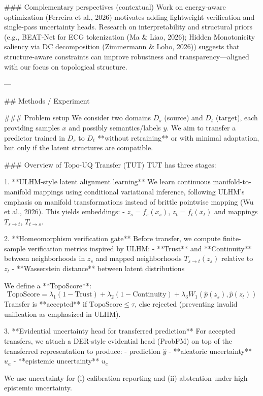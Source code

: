 ### Complementary perspectives (contextual)  
Work on energy-aware optimization (Ferreira et al., 2026) motivates adding lightweight verification and single-pass uncertainty heads. Research on interpretability and structural priors (e.g., BEAT-Net for ECG tokenization (Ma & Liao, 2026); Hidden Monotonicity saliency via DC decomposition (Zimmermann & Loho, 2026)) suggests that structure-aware constraints can improve robustness and transparency—aligned with our focus on topological structure.

---

## Methods / Experiment  

### Problem setup  
We consider two domains \(D_s\) (source) and \(D_t\) (target), each providing samples \(x\) and possibly semantics/labels \(y\). We aim to transfer a predictor trained in \(D_s\) to \(D_t\) **without retraining** or with minimal adaptation, but only if the latent structures are compatible.

### Overview of Topo-UQ Transfer (TUT)  
TUT has three stages:

1. **ULHM-style latent alignment learning**  
We learn continuous manifold-to-manifold mappings using conditional variational inference, following ULHM’s emphasis on manifold transformations instead of brittle pointwise mapping (Wu et al., 2026). This yields embeddings:
- \(z_s = f_s(x_s)\), \(z_t = f_t(x_t)\)  
and mappings \(T_{s\to t}\), \(T_{t\to s}\).

2. **Homeomorphism verification gate**  
Before transfer, we compute finite-sample verification metrics inspired by ULHM:
- **Trust** and **Continuity** between neighborhoods in \(z_s\) and mapped neighborhoods \(T_{s\to t}(z_s)\) relative to \(z_t\)
- **Wasserstein distance** between latent distributions

We define a **TopoScore**:
\[
\text{TopoScore} = \lambda_1(1-\text{Trust}) + \lambda_2(1-\text{Continuity}) + \lambda_3 W_1(\hat{p}(z_s),\hat{p}(z_t))
\]
Transfer is **accepted** if \(\text{TopoScore} \le \tau\), else rejected (preventing invalid unification as emphasized in ULHM).

3. **Evidential uncertainty head for transferred prediction**  
For accepted transfers, we attach a DER-style evidential head (ProbFM) on top of the transferred representation to produce:
- prediction \(\hat{y}\)
- **aleatoric uncertainty** \(u_a\)
- **epistemic uncertainty** \(u_e\)

We use uncertainty for (i) calibration reporting and (ii) abstention under high epistemic uncertainty.

